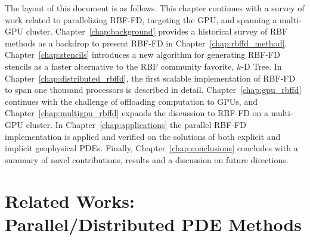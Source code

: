 \documentclass[11pt]{report}
\begin{document}
%
%
%
%



The layout of this document is as follows. This chapter continues with a survey of work related to parallelizing RBF-FD, targeting the GPU, and spanning a multi-GPU cluster. Chapter~\ref{chap:background} provides a historical survey of RBF methods as a backdrop to present RBF-FD in Chapter~\ref{chap:rbffd_method}. Chapter~\ref{chap:stencils} introduces a new algorithm for generating RBF-FD stencils as a faster alternative to the RBF community favorite, $k$-D Tree. In Chapter~\ref{chap:distributed_rbffd}, the first scalable implementation of RBF-FD to span one thousand processors is described in detail. Chapter~\ref{chap:gpu_rbffd} continues with the challenge of offloading computation to GPUs, and Chapter~\ref{chap:multigpu_rbffd} expands the discussion to RBF-FD on a multi-GPU cluster. In Chapter~\ref{chap:applications} the parallel RBF-FD implementation is applied and verified on the solutions of both explicit and implicit geophysical PDEs. Finally, Chapter~\ref{chap:conclusions} concludes with a summary of novel contributions, results and a discussion on future directions.

\section{Related Works: Parallel/Distributed PDE Methods} 
\end{document}
